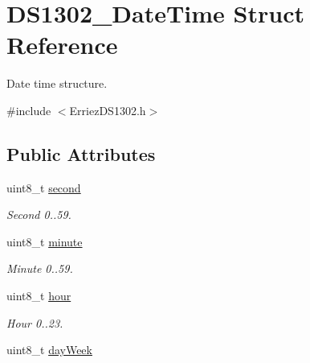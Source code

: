 \hypertarget{struct_d_s1302___date_time}{}\section{D\+S1302\+\_\+\+Date\+Time Struct Reference}
\label{struct_d_s1302___date_time}


Date time structure.  




{\ttfamily \#include $<$Erriez\+D\+S1302.\+h$>$}

\subsection*{Public Attributes}
\begin{DoxyCompactItemize}
\item 
uint8\+\_\+t \hyperlink{struct_d_s1302___date_time_a13577ffb4c390f4873bea7d58eef10e8}{second}\hypertarget{struct_d_s1302___date_time_a13577ffb4c390f4873bea7d58eef10e8}{}\label{struct_d_s1302___date_time_a13577ffb4c390f4873bea7d58eef10e8}

\begin{DoxyCompactList}\small\item\em Second 0..59. \end{DoxyCompactList}\item 
uint8\+\_\+t \hyperlink{struct_d_s1302___date_time_a53dd5392759b2355ed7056b64babe9d8}{minute}\hypertarget{struct_d_s1302___date_time_a53dd5392759b2355ed7056b64babe9d8}{}\label{struct_d_s1302___date_time_a53dd5392759b2355ed7056b64babe9d8}

\begin{DoxyCompactList}\small\item\em Minute 0..59. \end{DoxyCompactList}\item 
uint8\+\_\+t \hyperlink{struct_d_s1302___date_time_aea287766c87d50712a3e87c6c11955a8}{hour}\hypertarget{struct_d_s1302___date_time_aea287766c87d50712a3e87c6c11955a8}{}\label{struct_d_s1302___date_time_aea287766c87d50712a3e87c6c11955a8}

\begin{DoxyCompactList}\small\item\em Hour 0..23. \end{DoxyCompactList}\item 
uint8\+\_\+t \hyperlink{struct_d_s1302___date_time_a6a808f7780570d6684dba47e1d043358}{day\+Week}\hypertarget{struct_d_s1302___date_time_a6a808f7780570d6684dba47e1d043358}{}\label{struct_d_s1302___date_time_a6a808f7780570d6684dba47e1d043358}


\end{DoxyCompactItemize}
